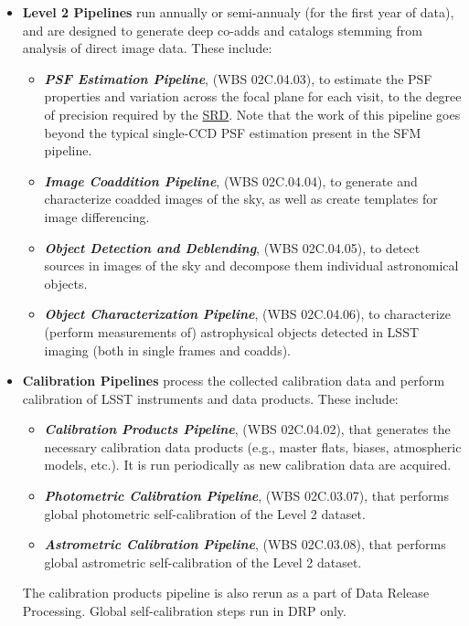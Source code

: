 \documentclass[12pt]{article}
\newcommand{\ds}[2]{{\color{blue} \href{https://docushare.lsstcorp.org/docushare/dsweb/Get/#1}{#2}}\xspace}
\newcommand{\SRD}{\ds{LPM-17}{SRD}}
\newcommand{\wbsPSF}{WBS 02C.04.03}
\newcommand{\wbsCoadd}{WBS 02C.04.04}
\newcommand{\wbsDetDeblend}{WBS 02C.04.05}
\newcommand{\wbsObjChar}{WBS 02C.04.06}
\newcommand{\wbsCPP}{WBS 02C.04.02}
\newcommand{\wbsPhotoCal}{WBS 02C.03.07}
\newcommand{\wbsAstroCal}{WBS 02C.03.08}
\begin{document}
\begin{itemize}
    \item {\bf Level 2 Pipelines} run annually or semi-annualy (for the first year of data), and are designed to generate deep co-adds and catalogs stemming from analysis of direct image data.  These include:
    \begin{itemize}
        \item {\bf \em PSF Estimation Pipeline}, (\wbsPSF), to estimate the PSF properties and variation across the focal plane for each visit, to the degree of precision required by the \SRD. Note that the work of this pipeline goes beyond the typical single-CCD PSF estimation present in the SFM pipeline.
        \item {\bf \em Image Coaddition Pipeline}, (\wbsCoadd), to generate and characterize coadded images of the sky, as well as create templates for image differencing.
        \item {\bf \em Object Detection and Deblending}, (\wbsDetDeblend), to detect sources in images of the sky and decompose them individual astronomical objects.
        \item {\bf \em Object Characterization Pipeline}, (\wbsObjChar), to characterize (perform measurements of) astrophysical objects detected in LSST imaging (both in single frames and coadds).
    \end{itemize}
    
    \item {\bf Calibration Pipelines} process the collected calibration data and perform calibration of LSST instruments and data products. These include:
    \begin{itemize}
        \item {\bf \em Calibration Products Pipeline}, (\wbsCPP), that generates the necessary calibration data products (e.g., master flats, biases, atmospheric models, etc.). It is run periodically as new calibration data are acquired.
        \item {\bf \em Photometric Calibration Pipeline}, (\wbsPhotoCal), that performs global photometric self-calibration of the Level 2 dataset.
        \item {\bf \em Astrometric Calibration Pipeline}, (\wbsAstroCal), that performs global astrometric self-calibration of the Level 2 dataset.
    \end{itemize}
    The calibration products pipeline is also rerun as a part of Data Release Processing. Global self-calibration steps run in DRP only.


\end{itemize}
\end{document}
